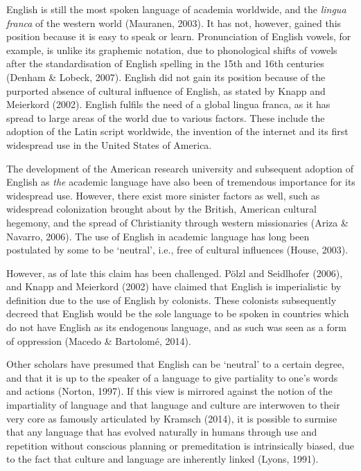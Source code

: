 English is still the most spoken language of academia worldwide, and the \textit{lingua franca} of the western world (Mauranen, 2003). It has not, however, gained this position because it is easy to speak or learn. Pronunciation of English vowels, for example, is unlike its graphemic notation, due to phonological shifts of vowels after the standardisation of English spelling in the 15th and 16th centuries (Denham \& Lobeck, 2007). English did not gain its position because of the purported absence of cultural influence of English, as stated by Knapp and Meierkord (2002). English fulfils the need of a global lingua franca, as it has spread to large areas of the world due to various factors. These include the adoption of the Latin script worldwide, the invention of the internet and its first widespread use in the United States of America. 

The development of the American research university and subsequent adoption of English as \textit{the} academic language have also been of tremendous importance for its widespread use. However, there exist more sinister factors as well, such as widespread colonization brought about by the British, American cultural hegemony, and the spread of Christianity through western missionaries (Ariza \& Navarro, 2006). The use of English in academic language has long been postulated by some to be ‘neutral’, i.e., free of cultural influences (House, 2003). 

However, as of late this claim has been challenged. Pölzl and Seidlhofer (2006), and Knapp and Meierkord (2002) have claimed that English is imperialistic by definition due to the use of English by colonists. These colonists subsequently decreed that English would be the sole language to be spoken in countries which do not have English as its endogenous language, and as such was seen as a form of oppression (Macedo \& Bartolomé, 2014).

Other scholars have presumed that English can be ‘neutral’ to a certain degree, and that it is up to the speaker of a language to give partiality to one’s words and actions (Norton, 1997). If this view is mirrored against the notion of the impartiality of language and that language and culture are interwoven to their very core as famously articulated by Kramsch (2014), it is possible to surmise that any language that has evolved naturally in humans through use and repetition without conscious planning or premeditation is intrinsically biased, due to the fact that culture and language are inherently linked (Lyons, 1991). 

